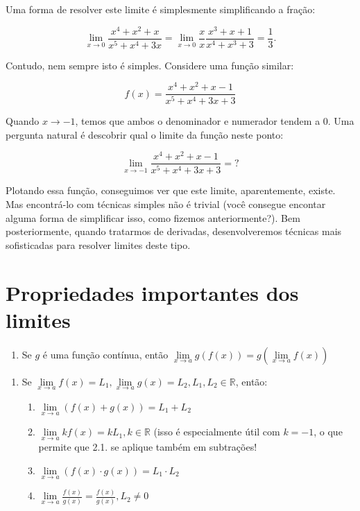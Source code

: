 \documentclass[
  portuguese,
  letterpaper,
  DIV=11,
  numbers=noendperiod]{scrreport}
\providecommand{\tightlist}{%
  \setlength{\itemsep}{0pt}\setlength{\parskip}{0pt}}
\begin{document}
Uma forma de resolver este limite é simplesmente simplificando a fração:

\[
\lim_{x\rightarrow 0} \frac{x^4 + x^2 + x}{x^5 + x^4 + 3x} = 
\lim_{x\rightarrow 0} \frac{x}{x} \frac{x^3 + x + 1}{x^4 + x^3 + 3} =
\frac{1}{3}.
\]

Contudo, nem sempre isto é simples. Considere uma função similar:

\[
f(x) = \frac{x^4 + x^2 + x - 1}{x^5 + x^4 + 3x + 3}
\]

Quando \(x\rightarrow -1\), temos que ambos o denominador e numerador
tendem a \(0\). Uma pergunta natural é descobrir qual o limite da função
neste ponto:

\[
\lim_{x\rightarrow -1} \frac{x^4 + x^2 + x - 1}{x^5 + x^4 + 3x + 3} = ?
\]

Plotando essa função, conseguimos ver que este limite, aparentemente,
existe. Mas encontrá-lo com técnicas simples não é trivial (você
consegue encontar alguma forma de simplificar isso, como fizemos
anteriormente?). Bem posteriormente, quando tratarmos de derivadas,
desenvolveremos técnicas mais sofisticadas para resolver limites deste
tipo.

\section{Propriedades importantes dos
limites}\label{propriedades-importantes-dos-limites}

\begin{enumerate}
\def\labelenumi{\arabic{enumi})}
\tightlist
\item
  Se \(g\) é uma função contínua, então
  \(\lim\limits_{x\rightarrow a} g(f(x)) = g(\lim\limits_{x\rightarrow a} f(x))\)
\end{enumerate}

\begin{enumerate}
\def\labelenumi{\arabic{enumi}.}
\setcounter{enumi}{1}
\tightlist
\item
  Se
  \(\lim\limits_{x\rightarrow a} f(x) = L_1, \lim\limits_{x\rightarrow a} g(x) = L_2, L_1, L_2 \in \mathbb{R}\),
  então:

  \begin{enumerate}
  \def\labelenumii{\arabic{enumii}.}
  \tightlist
  \item
    \(\lim\limits_{x\rightarrow a} (f(x) + g(x)) = L_1 + L_2\)
  \item
    \(\lim\limits_{x\rightarrow a} kf(x) = kL_1, k \in \mathbb{R}\)
    (isso é especialmente útil com \(k=-1\), o que permite que 2.1. se
    aplique também em subtrações!
  \item
    \(\lim\limits_{x\rightarrow a} (f(x) \cdot g(x)) = L_1 \cdot L_2\)
  \item
    \(\lim\limits_{x\rightarrow a} \frac{f(x)}{g(x)} = \frac{f(x)}{g(x)}, L_2 \neq 0\)
  \end{enumerate}
\end{enumerate}
\end{document}
